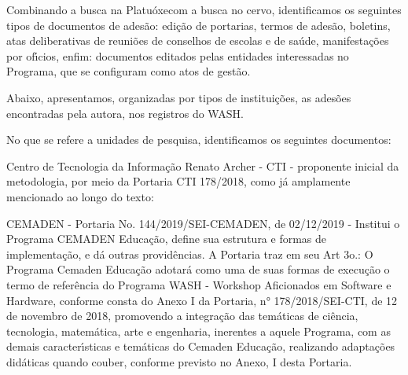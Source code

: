 \documentclass[
12pt,		%
openright,	%
twoside,  %
a4paper,			%
chapter=TITLE,		%
english,			%
french,				%
spanish,			%
brazil				%
]{USPSC-classe/USPSC}
\begin{document}
Combinando a busca na \textquotedbl Platu\'oxe\textquotedbl  com a busca no cervo, identificamos os seguintes tipos de documentos de ades\~ao:  edi\c{c}\~ao de portarias, termos de ades\~ao, boletins, atas deliberativas de reuni\~oes de conselhos de escolas e de sa\'ude, manifesta\c{c}\~oes por of\'{\i}cios, enfim: documentos editados pelas entidades interessadas no Programa, que se configuram como atos de gest\~ao.

















Abaixo, apresentamos, organizadas por tipos de institui\c{c}\~oes, as ades\~oes encontradas pela autora, nos registros do WASH.

















No que se refere a \textquotedbl unidades de pesquisa\textquotedbl , identificamos os seguintes documentos:


















\begin{alineas}
\item Centro de Tecnologia da Informa\c{c}\~ao Renato Archer - CTI - proponente inicial da metodologia, por meio da Portaria CTI 178/2018, como j\'a amplamente mencionado ao longo do texto:
\item CEMADEN - Portaria No. 144/2019/SEI-CEMADEN, de 02/12/2019 - Institui o Programa CEMADEN Educa\c{c}\~ao, define sua estrutura e formas de implementa\c{c}\~ao, e d\'a outras provid\^encias. A Portaria traz em seu Art 3o.: O Programa Cemaden Educa\c{c}\~ao adotar\'a como uma de suas formas de execu\c{c}\~ao o termo de refer\^encia do Programa WASH - Workshop Aficionados em Software e Hardware, conforme consta do Anexo I da Portaria, n° 178/2018/SEI-CTI, de 12 de novembro de 2018, promovendo a integra\c{c}\~ao das tem\'aticas de ci\^encia, tecnologia, matem\'atica, arte e engenharia, inerentes a aquele Programa, com as demais caracter\'{\i}sticas e tem\'aticas do Cemaden Educa\c{c}\~ao, realizando adapta\c{c}\~oes did\'aticas quando couber, conforme previsto no Anexo, I desta Portaria.
\end{alineas}
\end{document}
